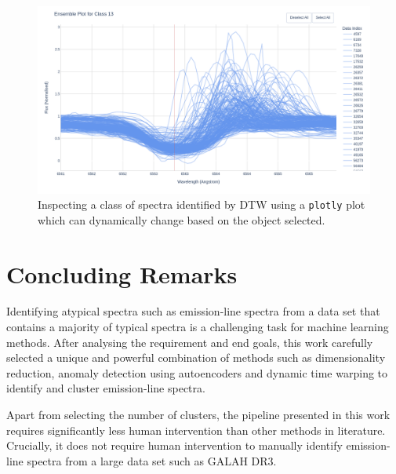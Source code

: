 \begin{figure}[!htb]
\centering
\includegraphics[scale=0.38]{figures/plotly image.png}
\caption{Inspecting a class of spectra identified by DTW using a \texttt{plotly} plot which can dynamically change based on the object selected.}
\end{figure}

\section{Concluding Remarks}

Identifying atypical spectra such as emission-line spectra from a data set that contains a majority of typical spectra is a challenging task for machine learning methods. After analysing the requirement and end goals, this work carefully selected a unique and powerful combination of methods such as dimensionality reduction, anomaly detection using autoencoders and dynamic time warping to identify and cluster emission-line spectra. 

Apart from selecting the number of clusters, the pipeline presented in this work requires significantly less human intervention than other methods in literature. Crucially, it does not require human intervention to manually identify emission-line spectra from a large data set such as GALAH DR3. 







